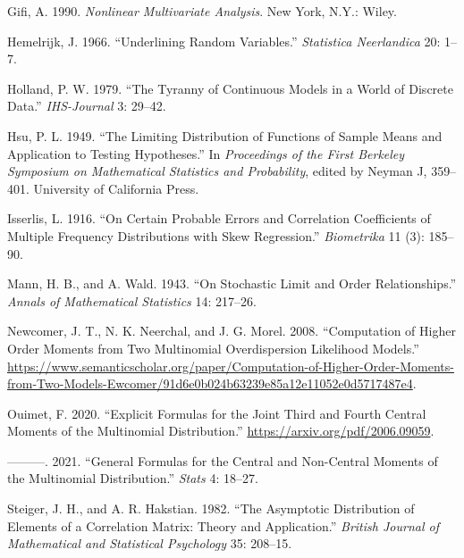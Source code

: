 \documentclass[
  12pt,
  letterpaper,
  DIV=11,
  numbers=noendperiod]{scrartcl}
\newlength{\cslhangindent}
\newenvironment{CSLReferences}[2] %
 {\begin{list}{}{%
  \setlength{\itemindent}{0pt}
  \setlength{\leftmargin}{0pt}
  \setlength{\parsep}{0pt}
  \ifodd #1
   \setlength{\leftmargin}{\cslhangindent}
   \setlength{\itemindent}{-1\cslhangindent}
  \fi
  \setlength{\itemsep}{#2\baselineskip}}}
 {\end{list}}
\begin{document}
\begin{CSLReferences}{1}{0}
Gifi, A. 1990. \emph{Nonlinear Multivariate Analysis}. New York, N.Y.:
Wiley.

Hemelrijk, J. 1966. {``{Underlining Random Variables}.''}
\emph{Statistica Neerlandica} 20: 1--7.

Holland, P. W. 1979. {``{The Tyranny of Continuous Models in a World of
Discrete Data}.''} \emph{IHS-Journal} 3: 29--42.

Hsu, P. L. 1949. {``The Limiting Distribution of Functions of Sample
Means and Application to Testing Hypotheses.''} In \emph{Proceedings of
the First Berkeley Symposium on Mathematical Statistics and
Probability}, edited by Neyman J, 359--401. University of California
Press.

Isserlis, L. 1916. {``On Certain Probable Errors and Correlation
Coefficients of Multiple Frequency Distributions with Skew
Regression.''} \emph{Biometrika} 11 (3): 185--90.

Mann, H. B., and A. Wald. 1943. {``{On Stochastic Limit and Order
Relationships}.''} \emph{Annals of Mathematical Statistics} 14: 217--26.

Newcomer, J. T., N. K. Neerchal, and J. G. Morel. 2008. {``Computation
of Higher Order Moments from Two Multinomial Overdispersion Likelihood
Models.''}
\url{https://www.semanticscholar.org/paper/Computation-of-Higher-Order-Moments-from-Two-Models-Ewcomer/91d6e0b024b63239e85a12e11052e0d5717487e4}.

Ouimet, F. 2020. {``Explicit Formulas for the Joint Third and Fourth
Central Moments of the Multinomial Distribution.''}
\url{https://arxiv.org/pdf/2006.09059}.

---------. 2021. {``General Formulas for the Central and Non-Central
Moments of the Multinomial Distribution.''} \emph{Stats} 4: 18--27.

Steiger, J. H., and A. R. Hakstian. 1982. {``{The Asymptotic
Distribution of Elements of a Correlation Matrix: Theory and
Application}.''} \emph{British Journal of Mathematical and Statistical
Psychology} 35: 208--15.

\end{CSLReferences}
\end{document}
